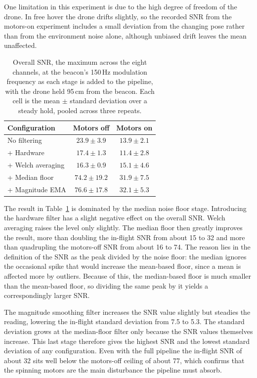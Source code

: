 One limitation in this experiment is due to the high degree of freedom of the drone. In free hover the drone drifts slightly, so the recorded SNR from the motors-on experiment includes a small deviation from the changing pose rather than from the environment noise alone, although unbiased drift leaves the mean unaffected.

\begin{table}[htbp]
    \centering
    \caption{Overall SNR, the maximum across the eight channels, at the beacon's 150\,Hz modulation frequency as each stage is added to the pipeline, with the drone held 95\,cm from the beacon. Each cell is the mean $\pm$ standard deviation over a steady hold, pooled across three repeats.}
    \label{tab:filter-snr}
    \begin{tabular}{l c c}
        \hline
        Configuration & Motors off & Motors on \\
        \hline
        No filtering        & $23.9 \pm 3.9$  & $13.9 \pm 2.1$ \\
        + Hardware          & $17.4 \pm 1.3$  & $11.4 \pm 2.8$ \\
        + Welch averaging   & $16.3 \pm 0.9$  & $15.1 \pm 4.6$ \\
        + Median floor      & $74.2 \pm 19.2$ & $31.9 \pm 7.5$ \\
        + Magnitude EMA     & $76.6 \pm 17.8$ & $32.1 \pm 5.3$ \\
        \hline
    \end{tabular}
\end{table}

The result in Table~\ref{tab:filter-snr} is dominated by the median noise floor stage. Introducing the hardware filter has a slight negative effect on the overall SNR. Welch averaging raises the level only slightly. The median floor then greatly improves the result, more than doubling the in-flight SNR from about 15 to 32 and more than quadrupling the motors-off SNR from about 16 to 74. The reason lies in the definition of the SNR as the peak divided by the noise floor: the median ignores the occasional spike that would increase the mean-based floor, since a mean is affected more by outliers. Because of this, the median-based floor is much smaller than the mean-based floor, so dividing the same peak by it yields a correspondingly larger SNR.

The magnitude smoothing filter increases the SNR value slightly but steadies the reading, lowering the in-flight standard deviation from 7.5 to 5.3. The standard deviation grows at the median-floor filter only because the SNR values themselves increase. This last stage therefore gives the highest SNR and the lowest standard deviation of any configuration. Even with the full pipeline the in-flight SNR of about 32 sits well below the motors-off ceiling of about 77, which confirms that the spinning motors are the main disturbance the pipeline must absorb.

